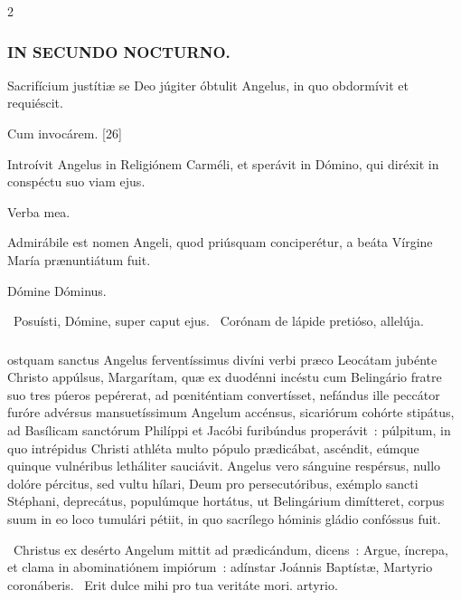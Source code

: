 \documentclass[9pt,twoside]{extarticle}
\begin{document}
\begin{multicols}{2}
{\subsubsection*{\center \textsc{IN SECUNDO NOCTURNO.}}
\begin{tightlist}{}
\item {} Sacrifícium justítiæ se Deo júgiter óbtulit Angelus, in quo obdormívit et requiéscit.
\item {} Cum invocárem. [26]
\item {} Introívit Angelus in Religiónem Carméli, et sperávit in Dómino, qui diréxit in conspéctu suo viam ejus.
\item {} Verba mea.
\item {} Admirábile est nomen Angeli, quod priúsquam conciperétur, a beáta Vírgine María prænuntiátum fuit.
\item {} Dómine Dóminus.
\item {}~Posuísti, Dómine, super caput ejus. ~Corónam de lápide pretióso, allelúja.
\end{tightlist}

\subsubsection*{\center {}}
ostquam sanctus Angelus ferventíssimus divíni verbi præco Leocátam jubénte Christo appúlsus, Margarítam, quæ ex duodénni incéstu cum Belingário fratre suo tres púeros pepérerat, ad pœniténtiam convertísset, nefándus ille peccátor furóre advérsus mansuetíssimum Angelum accénsus, sicariórum cohórte stipátus, ad Basílicam sanctórum Philíppi et Jacóbi furibúndus properávit~: púlpitum, in quo intrépidus Christi athléta multo pópulo prædicábat, ascéndit, eúmque quinque vulnéribus letháliter sauciávit. Angelus vero sánguine respérsus, nullo dolóre pércitus, sed vultu hílari, Deum pro persecutóribus, exémplo sancti Stéphani, deprecátus, populúmque hortátus, ut Belingárium dimítteret, corpus suum in eo loco tumulári pétiit, in quo sacrílego hóminis gládio confóssus fuit.

\begin{tightlist}{}
\item {}~Christus ex desérto Angelum mittit ad prædicándum, dicens~: Argue, íncrepa, et clama in abominatiónem impiórum~: adínstar Joánnis Baptístæ, \textred{*} Martyrio coronáberis.
~Erit dulce mihi pro tua veritáte mori. artyrio.
\end{tightlist}

}
\end{multicols}
\end{document}
